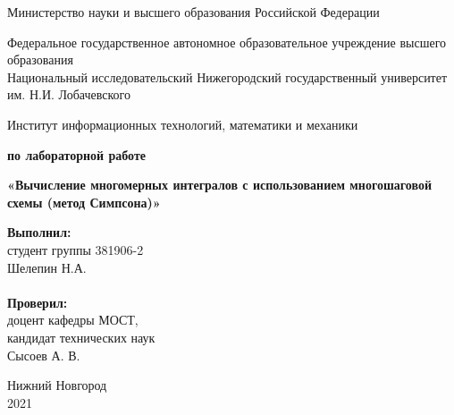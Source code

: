 \documentclass{report}
\begin{document}
\begin{titlepage}

\begin{center}
Министерство науки и высшего образования Российской Федерации
\end{center}

\begin{center}
Федеральное государственное автономное образовательное учреждение высшего образования \\
Национальный исследовательский Нижегородский государственный университет им. Н.И. Лобачевского
\end{center}

\begin{center}
Институт информационных технологий, математики и механики
\end{center}

\vspace{4em}

\begin{center}
\textbf{ по лабораторной работе} \\
\end{center}
\begin{center}
\textbf{\Large«Вычисление многомерных интегралов с использованием многошаговой схемы 
(метод Симпсона)»} \\
\end{center}

\vspace{4em}

\newbox{\lbox}
\newlength{\maxl}
\setlength{\maxl}{\wd\lbox}
\hfill\parbox{7cm}{
\hspace*{5cm}\hspace*{-5cm}\textbf{Выполнил:} \\ студент группы 381906-2 \\ Шелепин Н.А.\\
\\
\hspace*{5cm}\hspace*{-5cm}\textbf{Проверил:}\\ доцент кафедры МОСТ, \\ кандидат технических наук \\ Сысоев А. В.\\
}
\vspace{\fill}

\begin{center} Нижний Новгород \\ 2021 \end{center}

\end{titlepage}
\end{document}
